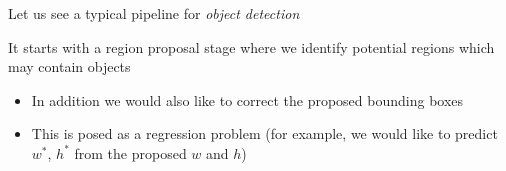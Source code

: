 
\begin{frame}
	\begin{overlayarea}{\textwidth}{\textheight}
		
		
		\begin{itemize}
			\justifying
			 {\item<1-> Let us see a typical pipeline for \it{object detection}
				\item<2-> It starts with a region proposal stage where we identify potential regions which may contain objects
			}
		\end{itemize}
	\end{overlayarea}     
	
\end{frame}


\begin{frame}
	\begin{overlayarea}{\textwidth}{\textheight}
		
		
		\begin{itemize}
			\justifying
			\item<1-> In addition we would also like to correct the proposed bounding boxes
			\item<2-> This is posed as a regression problem (for example, we would like to predict $w^*$, $h^*$ from the proposed $w$ and $h$)
		\end{itemize}
		
	\end{overlayarea}     
\end{frame}


